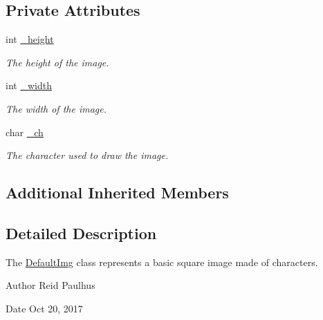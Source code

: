 \subsection*{Private Attributes}
\begin{DoxyCompactItemize}
\item 
int \hyperlink{classDefaultImg_a563e191151451d5d3058ed646b8008ab}{\-\_\-height}
\begin{DoxyCompactList}\small\item\em The height of the image. \end{DoxyCompactList}\item 
int \hyperlink{classDefaultImg_a258f5ac708d83e06e924985dab85f221}{\-\_\-width}
\begin{DoxyCompactList}\small\item\em The width of the image. \end{DoxyCompactList}\item 
char \hyperlink{classDefaultImg_afbcc3729a432f94806aec1414689863a}{\-\_\-ch}
\begin{DoxyCompactList}\small\item\em The character used to draw the image. \end{DoxyCompactList}\end{DoxyCompactItemize}
\subsection*{Additional Inherited Members}


\subsection{Detailed Description}
The \hyperlink{classDefaultImg}{Default\-Img} class represents a basic square image made of characters. 

\begin{DoxyAuthor}{Author}
Reid Paulhus 
\end{DoxyAuthor}
\begin{DoxyDate}{Date}
Oct 20, 2017 
\end{DoxyDate}


